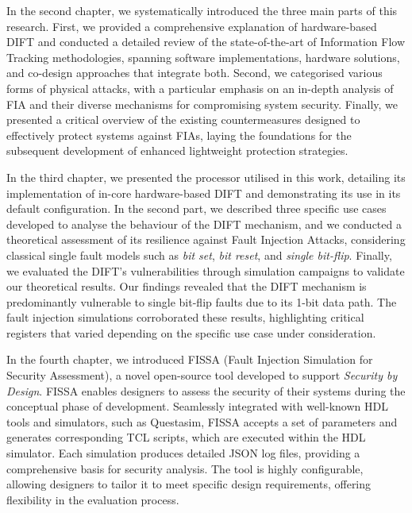 In the second chapter, we systematically introduced the three main parts of this research. First, we provided a comprehensive explanation of hardware-based DIFT and conducted a detailed review of the state-of-the-art of Information Flow Tracking methodologies, spanning software implementations, hardware solutions, and co-design approaches that integrate both. Second, we categorised various forms of physical attacks, with a particular emphasis on an in-depth analysis of FIA and their diverse mechanisms for compromising system security. Finally, we presented a critical overview of the existing countermeasures designed to effectively protect systems against FIAs, laying the foundations for the subsequent development of enhanced lightweight protection strategies.

In the third chapter, we presented the processor utilised in this work, detailing its implementation of in-core hardware-based DIFT and demonstrating its use in its default configuration. In the second part, we described three specific use cases developed to analyse the behaviour of the DIFT mechanism, and we conducted a theoretical assessment of its resilience against Fault Injection Attacks, considering classical single fault models such as \textit{bit set}, \textit{bit reset}, and \textit{single bit-flip}. Finally, we evaluated the DIFT's vulnerabilities through simulation campaigns to validate our theoretical results. Our findings revealed that the DIFT mechanism is predominantly vulnerable to single bit-flip faults due to its 1-bit data path. The fault injection simulations corroborated these results, highlighting critical registers that varied depending on the specific use case under consideration.

In the fourth chapter, we introduced FISSA (Fault Injection Simulation for Security Assessment), a novel open-source tool developed to support \textit{Security by Design}. FISSA enables designers to assess the security of their systems during the conceptual phase of development. Seamlessly integrated with well-known HDL tools and simulators, such as Questasim, FISSA accepts a set of parameters and generates corresponding TCL scripts, which are executed within the HDL simulator. Each simulation produces detailed JSON log files, providing a comprehensive basis for security analysis. The tool is highly configurable, allowing designers to tailor it to meet specific design requirements, offering flexibility in the evaluation process.

